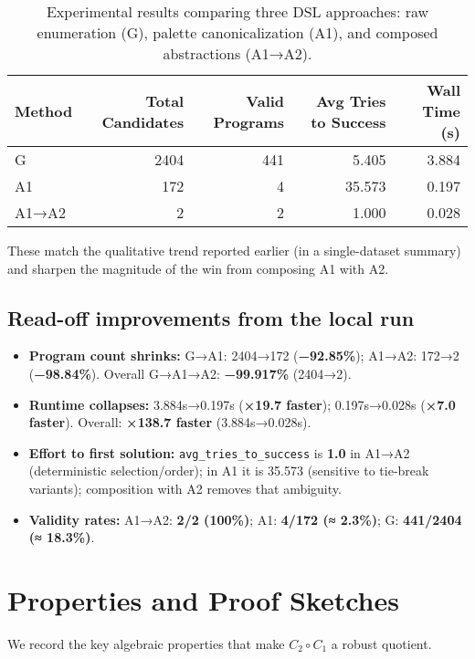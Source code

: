 \documentclass[11pt]{article}
\newcommand{\code}[1]{\texttt{#1}}
\begin{document}
\begin{table}[h]
\centering
\begin{tabular}{@{}lrrrr@{}}
\toprule
\textbf{Method} & \textbf{Total Candidates} & \textbf{Valid Programs} & \textbf{Avg Tries to Success} & \textbf{Wall Time (s)} \\
\midrule
G & 2404 & 441 & 5.405 & 3.884 \\
A1 & 172 & 4 & 35.573 & 0.197 \\
A1→A2 & 2 & 2 & 1.000 & 0.028 \\
\bottomrule
\end{tabular}
\caption{Experimental results comparing three DSL approaches: raw enumeration (G), palette canonicalization (A1), and composed abstractions (A1→A2).}
\label{tab:results}
\end{table}

These match the qualitative trend reported earlier (in a single-dataset summary) and sharpen the magnitude of the win from composing A1 with A2.

\subsection{Read-off improvements from the local run}

\begin{itemize}
\item \textbf{Program count shrinks:} G→A1: 2404→172 (\textbf{−92.85\%}); A1→A2: 172→2 (\textbf{−98.84\%}). Overall G→A1→A2: \textbf{−99.917\%} (2404→2).
\item \textbf{Runtime collapses:} 3.884s→0.197s (\textbf{×19.7 faster}); 0.197s→0.028s (\textbf{×7.0 faster}). Overall: \textbf{×138.7 faster} (3.884s→0.028s).
\item \textbf{Effort to first solution:} \code{avg\_tries\_to\_success} is \textbf{1.0} in A1→A2 (deterministic selection/order); in A1 it is 35.573 (sensitive to tie-break variants); composition with A2 removes that ambiguity.
\item \textbf{Validity rates:} A1→A2: \textbf{2/2 (100\%)}; A1: \textbf{4/172 (≈ 2.3\%)}; G: \textbf{441/2404 (≈ 18.3\%)}.
\end{itemize}

\section{Properties and Proof Sketches}

We record the key algebraic properties that make $C_2\!\circ C_1$ a robust quotient.
\end{document}
